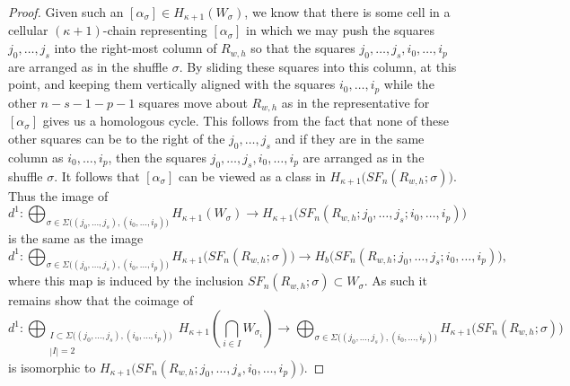 \documentclass[pagebackref,colorlinks,citecolor=blue,linkcolor=blue,urlcolor=blue,filecolor=blue]{article}
\theoremstyle{definition}\newtheorem{definition}[thm]{Definition}
\theoremstyle{definition}
\begin{document}
\begin{proof}
Given such an $[\alpha_{\sigma}]\in H_{\kappa+1}(W_{\sigma})$, we know that there is some cell in a cellular $(\kappa+1)$-chain representing $[\alpha_{\sigma}]$ in which we may push the squares $j_{0}, \dots, j_{s}$ into the right-most column of $R_{w, h}$ so that the squares $j_{0}, \dots, j_{s}, i_{0}, \dots, i_{p}$ are arranged as in the shuffle $\sigma$.
By sliding these squares into this column, at this point, and keeping them vertically aligned with the squares $i_{0}, \dots, i_{p}$ while the other $n-s-1-p-1$ squares move about $R_{w, h}$ as in the representative for $[\alpha_{\sigma}]$ gives us a homologous cycle. 
This follows from the fact that none of these other squares can be to the right of the $j_{0}, \dots, j_{s}$ and if they are in the same column as $i_{0}, \dots, i_{p}$, then the squares $j_{0}, \dots, j_{s}, i_{0}, \dots, i_{p}$ are arranged as in the shuffle $\sigma$.
It follows that $[\alpha_{\sigma}]$ can be viewed as a class in $H_{\kappa+1}\big(SF_{n}(R_{w, h}; \sigma)\big)$.
Thus the image of
\[
d^{1}:\bigoplus_{\sigma\in\Sigma\big((j_{0},\dots, j_{s}), (i_{0},\dots, i_{p})\big)}H_{\kappa+1}(W_{\sigma})\to H_{\kappa+1}\big(SF_{n}(R_{w, h}; j_{0}, \dots, j_{s}; i_{0}, \dots, i_{p})\big)
\]
is the same as the image 
\[
d^{1}:\bigoplus_{\sigma\in\Sigma\big((j_{0},\dots, j_{s}), (i_{0},\dots, i_{p})\big)}H_{\kappa+1}(SF_{n}(R_{w, h}; \sigma)\big)\to H_{b}\big(SF_{n}(R_{w, h}; j_{0}, \dots, j_{s}; i_{0}, \dots, i_{p})\big),
\]
where this map is induced by the inclusion $SF_{n}(R_{w, h}; \sigma)\subset W_{\sigma}$.
As such it remains show that the coimage of 
\begin{equation}\label{avoid repetitions}
d^{1}:\bigoplus_{\substack{I\subset \Sigma\big((j_{0},\dots, j_{s}), (i_{0},\dots, i_{p})\big)\\|I|=2}}H_{\kappa+1}\left(\bigcap_{i\in I}W_{\sigma_{i}}\right)\to \bigoplus_{\sigma\in\Sigma\big((j_{0},\dots, j_{s}), (i_{0},\dots, i_{p})\big)}H_{\kappa+1}\big(SF_{n}(R_{w, h}; \sigma)\big)
\end{equation}
is isomorphic to $H_{\kappa+1}\big(SF_{n}(R_{w, h}; j_{0}, \dots, j_{s}, i_{0}, \dots, i_{p})\big)$.


\end{proof}
\end{document}
